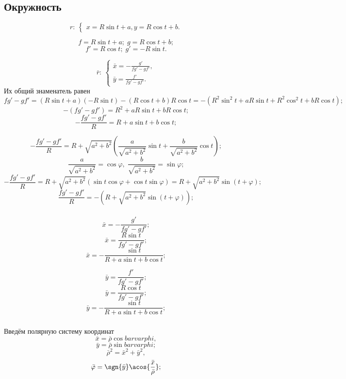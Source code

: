 \subsection{Окружность}
$$r: \: 
\left\{ \begin{gathered}
	x = R\sin{t}+a,
	y = R\cos{t}+b.
\end{gathered} \right.
$$

$$f = R\sin{t}+a; \; g = R\cos{t}+b;$$
$$f' = R\cos{t}; \; g' = -R\sin{t}.$$

$$\bar{r}:
\:
\left\{
\begin{gathered}
	\bar{x} =  -\frac{g'}{f g' - g f'},\\
	\bar{y} =  \frac{f'}{f g' - g f'}.
\end{gathered}
\right.
$$
Их общий знаменатель равен
$$f g' - g f' = (R\sin{t}+a)(-R\sin{t}) - (R\cos{t}+b) R\cos{t} = -\left(R^2\sin^2{t}+aR\sin{t} + R^2\cos^2{t} +bR\cos{t}\right);$$
$$-(f g' - g f') = R^2 + aR\sin{t} + bR\cos{t};$$
$$-\frac{f g' - g f'}{R} = R + a\sin{t} + b\cos{t};$$

$$-\frac{f g' - g f'}{R} = R + \sqrt{a^2+b^2}\left(\frac{a}{\sqrt{a^2+b^2}}\sin{t} + \frac{b}{\sqrt{a^2+b^2}}\cos{t}\right);$$
$$\frac{a}{\sqrt{a^2+b^2}} =\cos\varphi, \; \frac{b}{\sqrt{a^2+b^2}} = \sin\varphi;$$
$$-\frac{f g' - g f'}{R} = R + \sqrt{a^2+b^2}\left(\sin{t}\cos\varphi + \cos{t}\sin\varphi\right) = R + \sqrt{a^2+b^2}\sin{\left(t + \varphi \right)};$$
$$\frac{f g' - g f'}{R} = - \left( R + \sqrt{a^2+b^2}\sin{\left(t + \varphi \right)} \right);$$


\subparagraph{}
\begin{minipage}{0.4\textwidth}
$$\bar{x} =  -\frac{g'}{f g' - g f'};$$
$$\bar{x} =  \frac{R \sin{t}}{f g' - g f'};$$
$$\bar{x} =  -\frac{\sin{t}}{R + a\sin{t} + b\cos{t}};$$

\end{minipage}
\begin{minipage}{0.4\textwidth}
$$\bar{y} =  \frac{f'}{f g' - g f'};$$
$$\bar{y} =  \frac{R \cos{t}}{f g' - g f'};$$
$$\bar{y} =  -\frac{\sin{t}}{R + a\sin{t} + b\cos{t}};$$

\end{minipage}

\subparagraph{} Введём полярную систему координат
$$\bar{x} = \bar{\rho}\cos{bar{varphi}},$$
$$\bar{y} = \bar{\rho}\sin{bar{varphi}};$$
$$\bar{\rho}^2 = \bar{x}^2 + \bar{y}^2,$$
$$\bar{\varphi} = \sgn{\bar{y}}\acos{\frac{\bar{x}}{\bar{\rho}}};$$